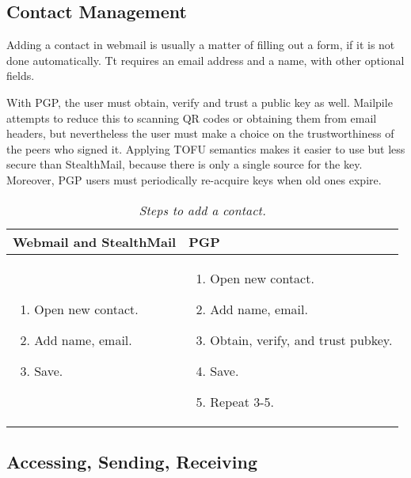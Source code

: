 \subsection{Contact Management}

Adding a contact in webmail is usually a matter of filling out a form, if it is not done automatically.  Tt requires an email address and a name, with other optional fields.

With PGP, the user must obtain, verify and trust a public key as well.  Mailpile attempts to reduce this to scanning QR codes or obtaining them from email headers, but nevertheless the user must make a choice on the trustworthiness of the peers who signed it.  Applying TOFU semantics makes it easier to use but less secure than StealthMail, because there is only a single source for the key.  Moreover, PGP users must periodically re-acquire keys when old ones expire.

\begin{table}[ht!]
\begin{tabular}{ | L{3.5cm} | L{3.5cm} |}
\hline
\textbf{Webmail and StealthMail} & \textbf{PGP} \\
\hline
\vspace{-3mm}
\begin{enumerate}
  \item{Open new contact.}
  \item{Add name, email.} 
  \item{Save.}
\end{enumerate} 
\vspace{-\topsep} &

\vspace{-3mm}
\begin{enumerate}
  \item{Open new contact.}
  \item{Add name, email.}
  \item{Obtain, verify, and trust pubkey.}
  \item{Save.}
  \item{Repeat 3-5.}
\end{enumerate} 
\vspace{-\topsep} \\

\hline
\end{tabular}
\caption{\it Steps to add a contact.}
\label{tab:account-creation}
\end{table}

\subsection{Accessing, Sending, Receiving}

